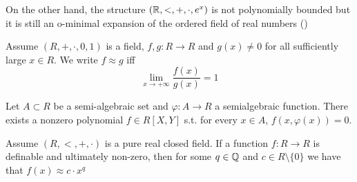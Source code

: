 \documentclass[11pt]{article}
\begin{document}
On the other hand, the structure \((\mathbb{R},<,+,\cdot,e^x)\) is not polynomially bounded but it is still an
o-minimal expansion of the ordered field of real numbers (\cite{Wilkie1996ModelCR})

\begin{definition}[]
Assume \((R,+,\cdot,0,1)\) is a field, \(f,g:R\to R\) and \(g(x)\neq 0\) for all sufficiently
large \(x\in R\). We write \(f\approx g\) iff
\begin{equation*}
\lim_{x\to+\infty}\frac{f(x)}{g(x)}=1
\end{equation*}
\end{definition}

\begin{lemma}
\label{B2.5.2}
Let \(A\subset R\) be a semi-algebraic set and \(\varphi:A\to R\) a semialgebraic function. There exists a
nonzero polynomial \(f\in R[X,Y]\) s.t. for every \(x\in A\), \(f(x,\varphi(x))=0\).
\end{lemma}

\begin{lemma}[3.5.5]
\label{3.5.5}
Assume \((R,<,+,\cdot)\) is a pure real closed field. If a function \(f:R\to R\) is definable and
ultimately non-zero, then for some \(q\in\mathbb{Q}\) and \(c\in R\setminus\{0\}\) we have that \(f(x)\approx c\cdot x^q\)
\end{lemma}
\end{document}
